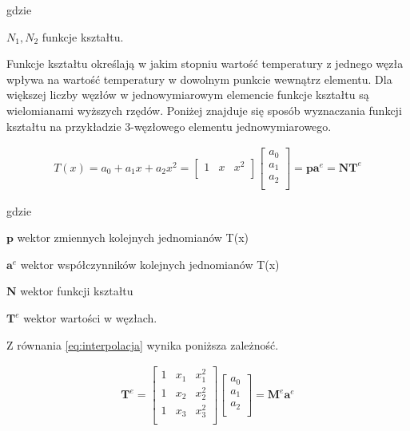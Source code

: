 gdzie
\begin{eqwhere}[2cm]
	\item[$N_1, N_2 $] funkcje kształtu.

\end{eqwhere}

Funkcje kształtu określają w jakim stopniu wartość temperatury z jednego węzła wpływa na wartość temperatury w dowolnym punkcie wewnątrz elementu. Dla większej liczby węzłów w jednowymiarowym elemencie funkcje kształtu są wielomianami wyższych rzędów. Poniżej znajduje się sposób wyznaczania funkcji kształtu na przykładzie 3-węzłowego elementu jednowymiarowego.

\begin{gather} \label{eq:interpolacja}
T(x) = a_0 + a_1 x + a_2 x^2 =
	\begin{bmatrix} 
	 	1 & x& x^2 \\
	\end{bmatrix}
	\begin{bmatrix} 
	 	a_0 \\
		a_1 \\
		a_2 \\
	\end{bmatrix} = \textbf{p} \textbf{a}^e = \textbf{N} \textbf{T}^e
\end{gather}

gdzie
\begin{eqwhere}[2cm]
	\item[$\textbf{p} $] wektor zmiennych kolejnych jednomianów T(x)
	\item[$\textbf{a}^e $] wektor współczynników kolejnych jednomianów T(x)
	\item[$\textbf{N} $] wektor funkcji kształtu
	\item[$\textbf{T}^e $] wektor wartości w węzłach.
\end{eqwhere}

Z równania \ref{eq:interpolacja} wynika poniższa zależność.

\begin{gather}
\textbf{T}^e =
	\begin{bmatrix} 
	 	1 & x_1& x_1^2 \\
		1 & x_2& x_2^2 \\
		1 & x_3& x_3^2 \\
	\end{bmatrix}
	\begin{bmatrix} 
	 	a_0 \\
		a_1 \\
		a_2 \\
	\end{bmatrix}
= \textbf{M}^e \textbf{a}^e
\end{gather}

